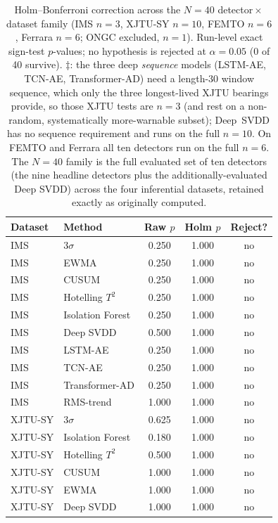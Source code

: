 \documentclass[journal]{IEEEtran}
\begin{document}
\begin{table}[t]
\caption{Holm--Bonferroni correction across the $N{=}40$ detector\,$\times$\,dataset
family (IMS $n{=}3$, XJTU-SY $n{=}10$, FEMTO $n{=}6$, Ferrara $n{=}6$; ONGC excluded,
$n{=}1$).
Run-level exact sign-test $p$-values; no hypothesis is rejected at
$\alpha{=}0.05$ (0 of 40 survive). $\ddagger$: the three deep \emph{sequence} models
(LSTM-AE, TCN-AE, Transformer-AD) need a length-30 window sequence, which only the
three longest-lived XJTU bearings provide, so those XJTU tests are $n{=}3$ (and rest on
a non-random, systematically more-warnable subset); Deep~SVDD has no sequence
requirement and runs on the full $n{=}10$. On FEMTO and Ferrara all ten detectors run
on the full $n{=}6$. The $N{=}40$ family is the full evaluated set of ten detectors
(the nine headline detectors plus the additionally-evaluated Deep SVDD) across the
four inferential datasets, retained exactly as originally computed.}
\label{tab:holm}
\centering
\footnotesize
\begin{tabular}{@{}llccc@{}}
\toprule
Dataset & Method & Raw $p$ & Holm $p$ & Reject? \\
\midrule
IMS     & 3$\sigma$        & 0.250 & 1.000 & no \\
IMS     & EWMA             & 0.250 & 1.000 & no \\
IMS     & CUSUM            & 0.250 & 1.000 & no \\
IMS     & Hotelling $T^2$  & 0.250 & 1.000 & no \\
IMS     & Isolation Forest & 0.250 & 1.000 & no \\
IMS     & Deep SVDD        & 0.500 & 1.000 & no \\
IMS     & LSTM-AE          & 0.250 & 1.000 & no \\
IMS     & TCN-AE           & 0.250 & 1.000 & no \\
IMS     & Transformer-AD   & 0.250 & 1.000 & no \\
IMS     & RMS-trend        & 1.000 & 1.000 & no \\
XJTU-SY & 3$\sigma$        & 0.625 & 1.000 & no \\
XJTU-SY & Isolation Forest & 0.180 & 1.000 & no \\
XJTU-SY & Hotelling $T^2$  & 0.500 & 1.000 & no \\
XJTU-SY & CUSUM            & 1.000 & 1.000 & no \\
XJTU-SY & EWMA             & 1.000 & 1.000 & no \\
XJTU-SY & Deep SVDD        & 1.000 & 1.000 & no \\

\end{tabular}
\end{table}
\end{document}

